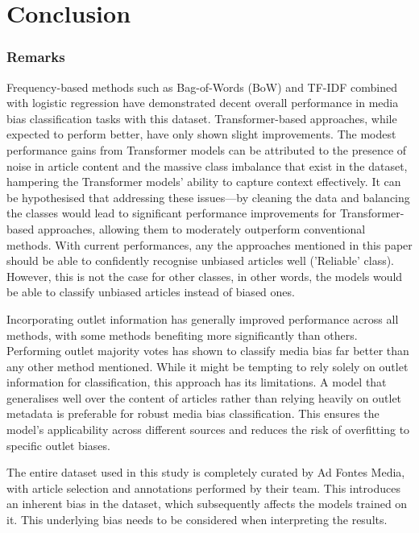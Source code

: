 \chapter{Conclusion}
\label{cha:7}

\subsection{Remarks}

Frequency-based methods such as Bag-of-Words (BoW) and TF-IDF combined with logistic regression have demonstrated decent overall performance in media bias classification tasks with this dataset. Transformer-based approaches, while expected to perform better, have only shown slight improvements. The modest performance gains from Transformer models can be attributed to the presence of noise in article content and the massive class imbalance that exist in the dataset, hampering the Transformer models' ability to capture context effectively. It can be hypothesised that addressing these issues—by cleaning the data and balancing the classes would lead to significant performance improvements for Transformer-based approaches, allowing them to moderately outperform conventional methods. With current performances, any the approaches mentioned in this paper should be able to confidently recognise unbiased articles well ('Reliable' class). However, this is not the case for other classes, in other words, the models would be able to classify unbiased articles instead of biased ones.

Incorporating outlet information has generally improved performance across all methods, with some methods benefiting more significantly than others. Performing outlet majority votes has shown to classify media bias far better than any other method mentioned. While it might be tempting to rely solely on outlet information for classification, this approach has its limitations. A model that generalises well over the content of articles rather than relying heavily on outlet metadata is preferable for robust media bias classification. This ensures the model's applicability across different sources and reduces the risk of overfitting to specific outlet biases.

The entire dataset used in this study is completely curated by Ad Fontes Media, with article selection and annotations performed by their team. This introduces an inherent bias in the dataset, which subsequently affects the models trained on it. This underlying bias needs to be considered when interpreting the results.

